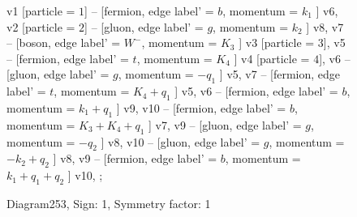 \documentclass{revtex4}
\begin{document}
\begin{figure}[!htb]
\begin{center}
{    %
v1 [particle = \(1\)] -- [fermion, edge label' = \(b\), momentum = \(k_{1}\) ] v6, 
v2 [particle = \(2\)] -- [gluon, edge label' = \(g\), momentum = \(k_{2}\) ] v8, 
v7 -- [boson, edge label' = \(W^{-}\), momentum = \(K_{3}\) ] v3 [particle = \(3\)], 
v5 -- [fermion, edge label' = \(t\), momentum = \(K_{4}\) ] v4 [particle = \(4\)], 
v6 -- [gluon, edge label' = \(g\), momentum = \(-q_{1}\) ] v5, 
v7 -- [fermion, edge label' = \(t\), momentum = \(K_{4} + q_{1}\) ] v5, 
v6 -- [fermion, edge label' = \(b\), momentum = \(k_{1} + q_{1}\) ] v9, 
v10 -- [fermion, edge label' = \(b\), momentum = \(K_{3} + K_{4} + q_{1}\) ] v7, 
v9 -- [gluon, edge label' = \(g\), momentum = \(-q_{2}\) ] v8, 
v10 -- [gluon, edge label' = \(g\), momentum = \(-k_{2} + q_{2}\) ] v8, 
v9 -- [fermion, edge label' = \(b\), momentum = \(k_{1} + q_{1} + q_{2}\) ] v10, 
};
\end{center}
\caption{Diagram253, Sign: 1, Symmetry factor: 1}
\end{figure}
\newpage
\end{document}
